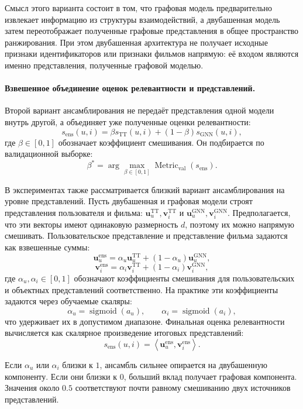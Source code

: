 \documentclass[12pt,fleqn]{article}
\begin{document}
Смысл этого варианта состоит в том, что графовая модель предварительно
извлекает информацию из структуры взаимодействий, а двубашенная модель затем
переотображает полученные графовые представления в общее пространство
ранжирования. При этом двубашенная архитектура не получает исходные
признаки идентификаторов или признаки фильмов напрямую: её входом являются именно
представления, полученные графовой моделью.


\paragraph{Взвешенное объединение оценок релевантности и представлений.}

Второй вариант ансамблирования не передаёт представления одной модели внутрь
другой, а объединяет уже полученные оценки релевантности:
$$
    s_{\mathrm{ens}}(u,i)=
    \beta s_{\mathrm{TT}}(u,i)
    +
    (1-\beta)s_{\mathrm{GNN}}(u,i),
$$
где $\beta\in[0,1]$ обозначает коэффициент смешивания. Он подбирается по
валидационной выборке:
$$
    \beta^{*}=
    \arg\max_{\beta\in[0,1]}
    \operatorname{Metric}_{\mathrm{val}}
    \left(
        s_{\mathrm{ens}}
    \right).
$$

В экспериментах также рассматривается близкий вариант ансамблирования на
уровне представлений. Пусть двубашенная и графовая модели строят представления
пользователя и фильма:
$
\mathbf{u}^{\mathrm{TT}}_u,
\mathbf{v}^{\mathrm{TT}}_i
$
и
$
\mathbf{u}^{\mathrm{GNN}}_u,
\mathbf{v}^{\mathrm{GNN}}_i
$.
Предполагается, что эти векторы имеют одинаковую размерность $d$, поэтому их
можно напрямую смешивать. Пользовательское представление и представление фильма
задаются как взвешенные суммы:
$$
    \mathbf{u}^{\mathrm{ens}}_u=
    \alpha_u\mathbf{u}^{\mathrm{TT}}_u+
    (1-\alpha_u)\mathbf{u}^{\mathrm{GNN}}_u,
$$
$$
    \mathbf{v}^{\mathrm{ens}}_i=
    \alpha_i\mathbf{v}^{\mathrm{TT}}_i+
    (1-\alpha_i)\mathbf{v}^{\mathrm{GNN}}_i,
$$
где $\alpha_u,\alpha_i\in[0,1]$ обозначают коэффициенты смешивания для
пользовательских и объектных представлений соответственно. На практике эти
коэффициенты задаются через обучаемые скаляры:
$$
    \alpha_u=\operatorname{sigmoid}(a_u),
    \qquad
    \alpha_i=\operatorname{sigmoid}(a_i),
$$
что удерживает их в допустимом диапазоне. Финальная оценка релевантности
вычисляется как скалярное произведение итоговых представлений:
$$
    s_{\mathrm{ens}}(u,i)=
    \left\langle
        \mathbf{u}^{\mathrm{ens}}_u,
        \mathbf{v}^{\mathrm{ens}}_i
    \right\rangle.
$$

Если $\alpha_u$ или $\alpha_i$ близки к $1$, ансамбль сильнее опирается на
двубашенную компоненту. Если они близки к $0$, больший вклад получает графовая
компонента. Значения около $0.5$ соответствуют почти равному смешиванию двух
источников представлений.
\end{document}
